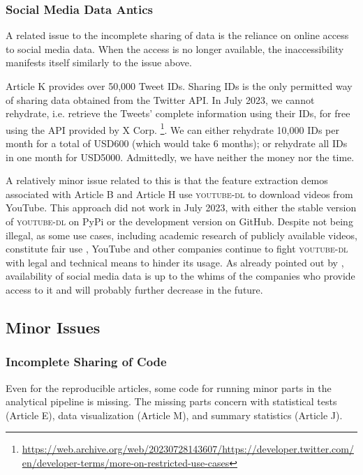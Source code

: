 \subsubsection{Social Media Data Antics}

A related issue to the incomplete sharing of data is the reliance on online access to social media data. When the access is no longer available, the inaccessibility manifests itself similarly to the issue above.

Article K provides over 50,000 Tweet IDs. Sharing IDs is the only permitted way of sharing data obtained from the Twitter API. In July 2023, we cannot rehydrate, i.e. retrieve the Tweets' complete information using their IDs, for free using the API provided by X Corp. \footnote{\url{https://web.archive.org/web/20230728143607/https://developer.twitter.com/en/developer-terms/more-on-restricted-use-cases}}. We can either rehydrate 10,000 IDs per month for a total of USD600 (which would take 6 months); or rehydrate all IDs in one month for USD5000. Admittedly, we have neither the money nor the time.

A relatively minor issue related to this is that the feature extraction demos associated with Article B and Article H use \textsc{youtube-dl} to download videos from YouTube. This approach did not work in July 2023, with either the stable version of \textsc{youtube-dl} on PyPi or the development version on GitHub.
Despite not being illegal, as some use cases, including academic research of publicly available videos, constitute fair use \parencite[]{HennesyLaw2019}, YouTube and other companies continue to fight \textsc{youtube-dl} with legal and technical means to hinder its usage.
As already pointed out by \textcite{freelonPostAPI2018}, availability of social media data is up to the whims of the companies who provide access to it and will probably further decrease in the future.

\subsection{Minor Issues}

\subsubsection{Incomplete Sharing of Code}

Even for the reproducible articles, some code for running minor parts in the analytical pipeline is missing. The missing parts concern with statistical tests (Article E), data visualization (Article M), and summary statistics (Article J).

